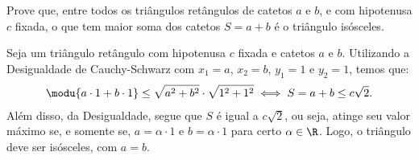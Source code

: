 \begin{example}
Prove que, entre todos os triângulos retângulos de catetos $a$ e $b$, e com hipotenusa $c$ fixada, o que tem maior soma dos catetos
$S = a+b$ é o triângulo isósceles.
\end{example}

\begin{solution}
Seja um triângulo retângulo com hipotenusa $c$ fixada e catetos $a$ e $b$. Utilizando a Desigualdade de Cauchy-Schwarz com $x_1 = a$, $x_2 = b$, $y_1 = 1$ e $y_2 = 1$, temos que:
%
\begin{align*}
\modu {a \cdot 1 + b \cdot 1} \le \sqrt{a^2 + b^2} \cdot \sqrt{1^2 + 1^2} \iff S = a+b \le c\sqrt 2.
\end{align*}
%
Além disso, da Desigualdade, segue que $S$ é igual a $c\sqrt 2$, ou seja, atinge seu valor máximo se, e somente se, $a = \alpha \cdot 1$ e $b = \alpha \cdot 1$ para certo $\alpha \in \R$. Logo, o triângulo deve ser isósceles, com $a=b$.
\end{solution}